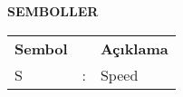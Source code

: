 \newpage
\pagestyle{plain}
\begin{center}
\textbf{SEMBOLLER}
\end{center}
\vspace{\satbos}

\begin{table}[h]
\begin{tabularx}{\textwidth}{@{}lcX@{}}
\textbf{Sembol} &  & \textbf{Açıklama}\\
S & : & Speed\\
\end{tabularx}
\end{table}
